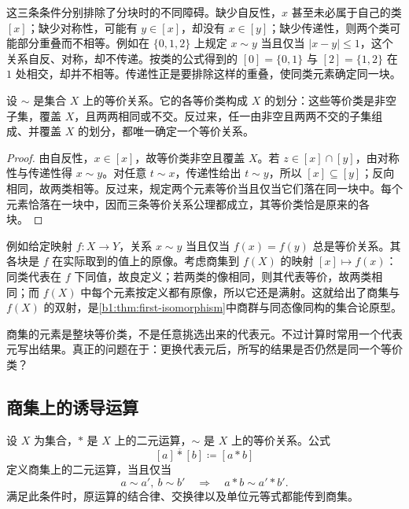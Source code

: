 这三条条件分别排除了分块时的不同障碍。缺少自反性，\(x\) 甚至未必属于自己的类 \([x]\)；缺少对称性，可能有 \(y\in[x]\)，却没有 \(x\in[y]\)；缺少传递性，则两个类可能部分重叠而不相等。例如在 \(\{0,1,2\}\) 上规定 \(x\sim y\) 当且仅当 \(|x-y|\leq1\)，这个关系自反、对称，却不传递。按类的公式得到的 \([0]=\{0,1\}\) 与 \([2]=\{1,2\}\) 在 \(1\) 处相交，却并不相等。传递性正是要排除这样的重叠，使同类元素确定同一块。

\begin{proposition}\label{b1:prop:partition-equivalence}
	设 \(\sim\) 是集合 \(X\) 上的等价关系。它的各等价类构成 \(X\) 的划分：这些等价类是非空子集，覆盖 \(X\)，且两两相同或不交。反过来，任一由非空且两两不交的子集组成、并覆盖 \(X\) 的划分，都唯一确定一个等价关系。
\end{proposition}

\begin{proof}
	由自反性，\(x\in[x]\)，故等价类非空且覆盖 \(X\)。若 \(z\in[x]\cap[y]\)，由对称性与传递性得 \(x\sim y\)。对任意 \(t\sim x\)，传递性给出 \(t\sim y\)，所以 \([x]\subseteq[y]\)；反向相同，故两类相等。反过来，规定两个元素等价当且仅当它们落在同一块中。每个元素恰落在一块中，因而三条等价关系公理都成立，其等价类恰是原来的各块。
\end{proof}

例如给定映射 \(f:X\rightarrow Y\)，关系 \(x\sim y\) 当且仅当 \(f(x)=f(y)\) 总是等价关系。其各块是 \(f\) 在实际取到的值上的原像。考虑商集到 \(f(X)\) 的映射 \([x]\mapsto f(x)\)：同类代表在 \(f\) 下同值，故良定义；若两类的像相同，则其代表等价，故两类相同；而 \(f(X)\) 中每个元素按定义都有原像，所以它还是满射。这就给出了商集与 \(f(X)\) 的双射，是\cref{b1:thm:first-isomorphism}中商群与同态像同构的集合论原型。

\ProseParagraphBreak
商集的元素是整块等价类，不是任意挑选出来的代表元。不过计算时常用一个代表元写出结果。真正的问题在于：更换代表元后，所写的结果是否仍然是同一个等价类？

\subsection{商集上的诱导运算}
\label{b1:subsec:0103:02}

\begin{proposition}[运算下降的判据]\label{b1:prop:operation-descends}
	设 \(X\) 为集合，\(*\) 是 \(X\) 上的二元运算，\(\sim\) 是 \(X\) 上的等价关系。公式
	\[
		[a]\mathbin{\overline *}[b]\coloneqq[a*b]
	\]
	定义商集上的二元运算，当且仅当
	\[
		a\sim a',\ b\sim b'\quad\Longrightarrow\quad a*b\sim a'*b'.
	\]
	满足此条件时，原运算的结合律、交换律以及单位元等式都能传到商集。
\end{proposition}

